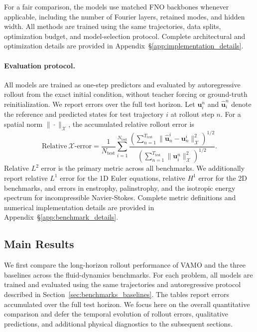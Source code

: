 \documentclass[11pt]{article}
\begin{document}
For a fair comparison, the models use matched FNO backbones whenever applicable, including the number of Fourier layers, retained modes, and hidden width. All methods are trained using the same trajectories, data splits, optimization budget, and model-selection protocol. Complete architectural and optimization details are provided in Appendix~\S\ref{app:implementation_details}.


\paragraph{Evaluation protocol.}
All models are trained as one-step predictors and evaluated by autoregressive rollout from the exact initial condition, without teacher forcing or ground-truth reinitialization. We report errors over the full test horizon. Let $\mathbf{u}_i^n$ and $\widehat{\mathbf{u}}_i^n$ denote the reference and predicted states for test trajectory $i$ at rollout step $n$. For a spatial norm $\|\cdot\|_\mathcal{X}$, the accumulated relative rollout error is
\[
\mathrm{Relative}\ \mathcal{X}\text{-}\mathrm{error}
=
\frac{1}{N_{\mathrm{test}}}
\sum_{i=1}^{N_{\mathrm{test}}}
\frac{
\left(
\sum_{n=1}^{T_{\mathrm{test}}}
\|\widehat{\mathbf{u}}^i_n-\mathbf{u}^i_n\|_{\mathcal X}^2
\right)^{1/2}
}{
\left(
\sum_{n=1}^{T_{\mathrm{test}}}
\|\mathbf{u}_i^n\|_{\mathcal X}^2
\right)^{1/2}
}.
\]
Relative $L^2$ error is the primary metric across all benchmarks. We additionally report relative $L^1$ error for the 1D Euler equations, relative $H^1$ error for the 2D benchmarks, and errors in enstrophy, palinstrophy, and the isotropic energy spectrum for incompressible Navier-Stokes. Complete metric definitions and numerical implementation details are provided in Appendix~\S\ref{app:benchmark_details}.


\subsection{Main Results}\label{sec:main_results}
We first compare the long-horizon rollout performance of VAMO and the three baselines across the fluid-dynamics benchmarks. For each problem, all models are trained and evaluated using the same trajectories and autoregressive protocol described in Section~\ref{sec:benchmarks_baselines}. The tables report errors accumulated over the full test horizon. We focus here on the overall quantitative comparison and defer the temporal evolution of rollout errors, qualitative predictions, and additional physical diagnostics to the subsequent sections.
\end{document}
